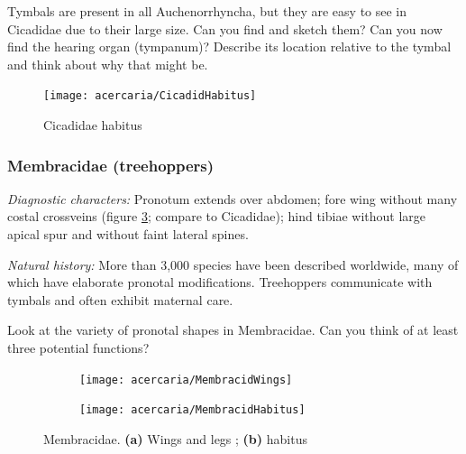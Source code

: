 \begin{theo}
{}Tymbals are present in all Auchenorrhyncha, but they are easy to see in Cicadidae due to their large size. Can you find and sketch them? Can you now find the hearing organ (tympanum)? Describe its location relative to the tymbal and think about why that might be.
\end{theo}

\begin{figure}[ht!]
 \centering
 \texttt{[image: acercaria/CicadidHabitus]}
 \caption{Cicadidae habitus \citep[][Plate 100]{bhl33187}}
 \label{fig:cicadidae}
\end{figure}

\subsubsection{Membracidae (treehoppers)}
\noindent{}\textit{Diagnostic characters:} Pronotum extends over abdomen; fore wing without many costal crossveins (figure \ref{fig:membrac2}; compare to Cicadidae); hind tibiae without large apical spur and without faint lateral spines.\vspace{3mm}

\noindent{}\textit{Natural history:} More than 3,000 species have been described worldwide, many of which have elaborate pronotal modifications. Treehoppers communicate with tymbals and often exhibit maternal care.\vspace{3mm}

\begin{theo}
{}Look at the variety of pronotal shapes in Membracidae. Can you think of at least three potential functions?
\end{theo} 

\begin{figure}[ht!]
 \centering
 \begin{subfigure}[ht!]{0.45\textwidth}
  \texttt{[image: acercaria/MembracidWings]}
  \caption{}
  \label{fig:membrac1}
 \end{subfigure}
 \hfill
 \begin{subfigure}[ht!]{0.45\textwidth}
  \texttt{[image: acercaria/MembracidHabitus]}
  \caption{}
  \label{fig:membrac2}
 \end{subfigure}
 \caption{Membracidae. \textbf{(a)} Wings and legs \citep[][Plate I, Figs. 4c,4e]{bhl79792}; \textbf{(b)} habitus \citep[][Plate XLIV, Fig. 2]{bhlitem33127}}\label{fig:membracid}
\end{figure}

